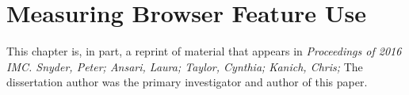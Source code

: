 \chapter{Measuring Browser Feature Use}
\label{measurement}

This chapter is, in part, a reprint of material that appears in
\textit{Proceedings of 2016 IMC. Snyder, Peter; Ansari, Laura; Taylor, Cynthia;
Kanich, Chris;} The dissertation author was the primary investigator and author
of this paper.







